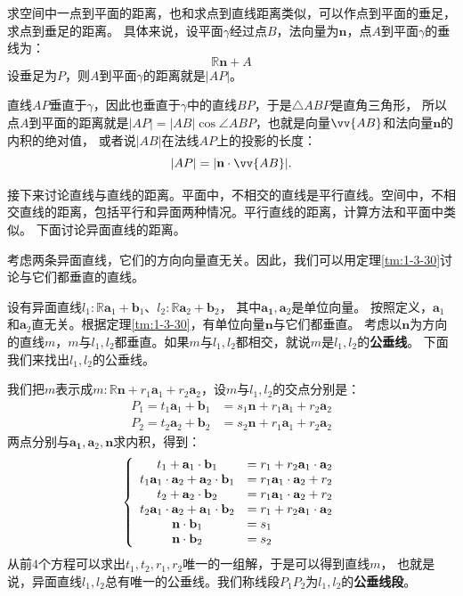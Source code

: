\documentclass[12pt,UTF8]{ctexbook}
\begin{document}
求空间中一点到平面的距离，也和求点到直线距离类似，可以作点到平面的垂足，求点到垂足的距离。
具体来说，设平面$\gamma$经过点$B$，法向量为$\mathbf{n}$，点$A$到平面$\gamma$的垂线为：
$$ \mathbb{R}\mathbf{n} + A$$
设垂足为$P$，则$A$到平面$\gamma$的距离就是$|AP|$。

直线$AP$垂直于$\gamma$，因此也垂直于$\gamma$中的直线$BP$，于是$\triangle ABP$是直角三角形，
所以点$A$到平面的距离就是$|AP| = |AB|\cos{\angle ABP}$，也就是向量$\vv{AB}$和法向量$\mathbf{n}$的内积的绝对值，
或者说$|AB|$在法线$AP$上的投影的长度：
$$ |AP| = |\mathbf{n}\cdot \vv{AB}|. $$

接下来讨论直线与直线的距离。平面中，不相交的直线是平行直线。空间中，不相交直线的距离，包括平行和异面两种情况。平行直线的距离，计算方法和平面中类似。
下面讨论异面直线的距离。

考虑两条异面直线，它们的方向向量直无关。因此，我们可以用定理\ref{tm:1-3-30}讨论与它们都垂直的直线。

设有异面直线$l_1:\mathbb{R}\mathbf{a}_1 + \mathbf{b}_1$、$l_2:\mathbb{R}\mathbf{a}_2 + \mathbf{b}_2$，
其中$\mathbf{a_1}, \mathbf{a}_2$是单位向量。
按照定义，$\mathbf{a}_1$和$\mathbf{a}_2$直无关。根据定理\ref{tm:1-3-30}，有单位向量$\mathbf{n}$与它们都垂直。
考虑以$\mathbf{n}$为方向的直线$m$，$m$与$l_1,l_2$都垂直。如果$m$与$l_1,l_2$都相交，就说$m$是$l_1,l_2$的\textbf{公垂线}。
下面我们来找出$l_1,l_2$的公垂线。

我们把$m$表示成$m: \mathbb{R}\mathbf{n} + r_1\mathbf{a}_1 + r_2\mathbf{a}_2$，设$m$与$l_1,l_2$的交点分别是：
\begin{align*}
    P_1 = t_1\mathbf{a}_1 + \mathbf{b}_1 &= s_1\mathbf{n} + r_1\mathbf{a}_1 + r_2\mathbf{a}_2  \\
    P_2 = t_2\mathbf{a}_2 + \mathbf{b}_2 &= s_2\mathbf{n} + r_1\mathbf{a}_1 + r_2\mathbf{a}_2  
\end{align*}
两点分别与$\mathbf{a_1}, \mathbf{a}_2,\mathbf{n}$求内积，得到：
$$
\left\{
\begin{array}[]{cl}
    t_1 + \mathbf{a}_1\cdot\mathbf{b}_1 &= r_1 + r_2\mathbf{a}_1\cdot\mathbf{a}_2 \\
    t_1\mathbf{a}_1\cdot\mathbf{a}_2 + \mathbf{a}_2\cdot\mathbf{b}_1 &= r_1\mathbf{a}_1\cdot\mathbf{a}_2 + r_2 \\
    t_2 + \mathbf{a}_2\cdot\mathbf{b}_2 &= r_1\mathbf{a}_1\cdot\mathbf{a}_2 + r_2 \\
    t_2\mathbf{a}_1\cdot\mathbf{a}_2 + \mathbf{a}_1\cdot\mathbf{b}_2 &= r_1 + r_2\mathbf{a}_1\cdot\mathbf{a}_2 \\
    \mathbf{n}\cdot\mathbf{b}_1 &= s_1 \\
    \mathbf{n}\cdot\mathbf{b}_2 &= s_2
\end{array}
\right.
$$
从前$4$个方程可以求出$t_1,t_2,r_1,r_2$唯一的一组解，于是可以得到直线$m$，
也就是说，异面直线$l_1,l_2$总有唯一的公垂线。我们称线段$P_1P_2$为$l_1,l_2$的\textbf{公垂线段}。
\end{document}
